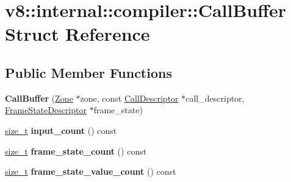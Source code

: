 \hypertarget{structv8_1_1internal_1_1compiler_1_1CallBuffer}{}\section{v8\+:\+:internal\+:\+:compiler\+:\+:Call\+Buffer Struct Reference}
\label{structv8_1_1internal_1_1compiler_1_1CallBuffer}
\subsection*{Public Member Functions}
\begin{DoxyCompactItemize}
\item 
\mbox{\label{structv8_1_1internal_1_1compiler_1_1CallBuffer_abb21604fdf856a609cb50e8de79e1f3e}} 
{\bfseries Call\+Buffer} (\mbox{\hyperlink{classv8_1_1internal_1_1Zone}{Zone}} $\ast$zone, const \mbox{\hyperlink{classv8_1_1internal_1_1compiler_1_1CallDescriptor}{Call\+Descriptor}} $\ast$call\+\_\+descriptor, \mbox{\hyperlink{classv8_1_1internal_1_1compiler_1_1FrameStateDescriptor}{Frame\+State\+Descriptor}} $\ast$frame\+\_\+state)
\item 
\mbox{\label{structv8_1_1internal_1_1compiler_1_1CallBuffer_a5d736b64ff6f499de8ef80a768bea798}} 
\mbox{\hyperlink{classsize__t}{size\+\_\+t}} {\bfseries input\+\_\+count} () const
\item 
\mbox{\label{structv8_1_1internal_1_1compiler_1_1CallBuffer_a29e449bd066e3b975e1a0a508f6e74fd}} 
\mbox{\hyperlink{classsize__t}{size\+\_\+t}} {\bfseries frame\+\_\+state\+\_\+count} () const
\item 
\mbox{\label{structv8_1_1internal_1_1compiler_1_1CallBuffer_a86cc7fb6b3625b418f438f4bc3ff29ee}} 
\mbox{\hyperlink{classsize__t}{size\+\_\+t}} {\bfseries frame\+\_\+state\+\_\+value\+\_\+count} () const
\end{DoxyCompactItemize}
